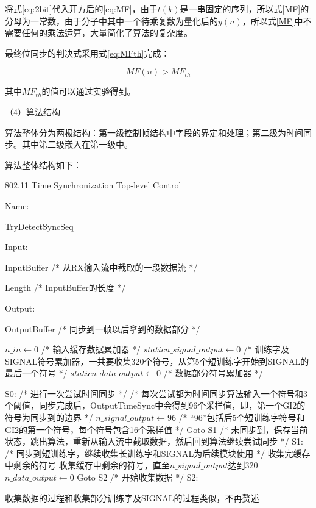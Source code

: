 \documentclass[titlepage]{article}
\numberwithin{figure}{section}
\numberwithin{equation}{section}
\begin{document}
将式\ref{eq:2bit}代入开方后的\ref{eq:MF}，由于$t(k)$是一串固定的序列，所以式\ref{MF}的分母为一常数，由于分子中其中一个待乘复数为量化后的$y(n)$，所以式\ref{MF}中不需要任何的乘法运算，大量简化了算法的复杂度。

最终位同步的判决式采用式\ref{eq:MFth}完成：

\begin{equation}\label{eq:MFth}
MF(n)>MF_{th}
\end{equation}

其中$MF_{th}$的值可以通过实验得到。

（4）算法结构

算法整体分为两极结构：第一级控制帧结构中字段的界定和处理；第二级为时间同步。其中第二级嵌入在第一级中。

算法整体结构如下：

\begin{algorithm}[H]
\caption{802.11 Time Synchronization Top-level Control}
Name:

TryDetectSyncSeq

Input:
 
InputBuffer /* 从RX输入流中截取的一段数据流 */

Length /* InputBuffer的长度 */

Output:

OutputBuffer /* 同步到一帧以后拿到的数据部分 */

\begin{algorithmic}[1]
\State $n\_in \gets 0$ /* 输入缓存数据累加器 */
\State $static n\_signal\_output \gets 0$ /* 训练字及SIGNAL符号累加器，一共要收集320个符号，从第5个短训练字开始到SIGNAL的最后一个符号 */
\State $static n\_data\_output \gets 0$ /* 数据部分符号累加器 */

\State S0:
\State /* 进行一次尝试时间同步 */
\State /* 每次尝试都为时间同步算法输入一个符号和3个阈值，同步完成后，OutputTimeSync中会得到96个采样值，即，第一个GI2的符号为同步到的边界 */
\State $n\_signal\_output \gets 96$ /* “96”包括后5个短训练字符号和GI2的第一个符号，每个符号包含16个采样值 */
\State Goto S1 
\EndIf
\EndWhile
{}
\State /* 未同步到，保存当前状态，跳出算法，重新从输入流中截取数据，然后回到算法继续尝试同步 */
\EndIf
\State S1:
\State /* 同步到短训练字，继续收集长训练字和SIGNAL为后续模块使用 */
\State 收集完缓存中剩余的符号
\Else
\State 收集缓存中剩余的符号，直至$n\_signal\_output$达到320
\State $n\_data\_output \gets 0$
\State Goto S2 /* 开始收集数据 */
\EndIf
\State S2:

\State 收集数据的过程和收集部分训练字及SIGNAL的过程类似，不再赘述

\end{algorithmic}
\end{algorithm}
\end{document}
